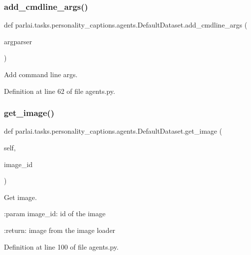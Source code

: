 \subsubsection{\texorpdfstring{add\+\_\+cmdline\+\_\+args()}{add\_cmdline\_args()}}
{\footnotesize\ttfamily def parlai.\+tasks.\+personality\+\_\+captions.\+agents.\+Default\+Dataset.\+add\+\_\+cmdline\+\_\+args (\begin{DoxyParamCaption}\item[{}]{argparser }\end{DoxyParamCaption})\hspace{0.3cm}{\ttfamily [static]}}

\begin{DoxyVerb}Add command line args.\end{DoxyVerb}
 

Definition at line 62 of file agents.\+py.

\mbox{\label{classparlai_1_1tasks_1_1personality__captions_1_1agents_1_1DefaultDataset_a1af0abcddf51525898da67e2e796c525}} 
\subsubsection{\texorpdfstring{get\+\_\+image()}{get\_image()}}
{\footnotesize\ttfamily def parlai.\+tasks.\+personality\+\_\+captions.\+agents.\+Default\+Dataset.\+get\+\_\+image (\begin{DoxyParamCaption}\item[{}]{self,  }\item[{}]{image\+\_\+id }\end{DoxyParamCaption})}

\begin{DoxyVerb}Get image.

:param image_id:
    id of the image

:return:
    image from the image loader
\end{DoxyVerb}
 

Definition at line 100 of file agents.\+py.



